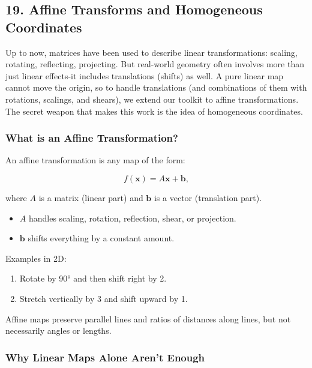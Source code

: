 \documentclass[
  letterpaper,
  DIV=11,
  numbers=noendperiod]{scrreprt}
\providecommand{\tightlist}{%
  \setlength{\itemsep}{0pt}\setlength{\parskip}{0pt}}
\begin{document}
\subsection{19. Affine Transforms and Homogeneous
Coordinates}\label{affine-transforms-and-homogeneous-coordinates}

Up to now, matrices have been used to describe linear transformations:
scaling, rotating, reflecting, projecting. But real-world geometry often
involves more than just linear effects-it includes translations (shifts)
as well. A pure linear map cannot move the origin, so to handle
translations (and combinations of them with rotations, scalings, and
shears), we extend our toolkit to affine transformations. The secret
weapon that makes this work is the idea of homogeneous coordinates.

\subsubsection{What is an Affine
Transformation?}\label{what-is-an-affine-transformation}

An affine transformation is any map of the form:

\[
f(\mathbf{x}) = A\mathbf{x} + \mathbf{b},
\]

where \(A\) is a matrix (linear part) and \(\mathbf{b}\) is a vector
(translation part).

\begin{itemize}
\tightlist
\item
  \(A\) handles scaling, rotation, reflection, shear, or projection.
\item
  \(\mathbf{b}\) shifts everything by a constant amount.
\end{itemize}

Examples in 2D:

\begin{enumerate}
\def\labelenumi{\arabic{enumi}.}
\tightlist
\item
  Rotate by 90° and then shift right by 2.
\item
  Stretch vertically by 3 and shift upward by 1.
\end{enumerate}

Affine maps preserve parallel lines and ratios of distances along lines,
but not necessarily angles or lengths.

\subsubsection{Why Linear Maps Alone Aren't
Enough}\label{why-linear-maps-alone-arent-enough}
\end{document}
